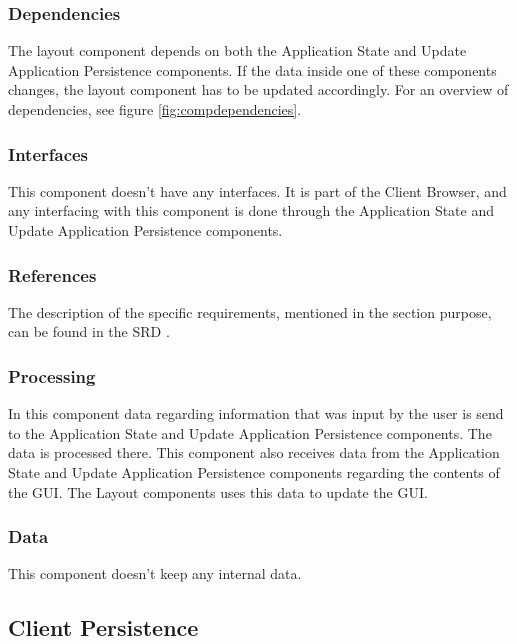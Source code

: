\subsubsection*{Dependencies}
The layout component depends on both the Application State and Update Application Persistence components. If the data inside one of these components changes, the layout component has to be updated accordingly. For an overview of dependencies, see figure \ref{fig:compdependencies}.

\subsubsection*{Interfaces}
This component doesn't have any interfaces. It is part of the Client Browser, and any interfacing with this component is done through the Application State and Update Application Persistence components.

\subsubsection*{References}
The description of the specific requirements, mentioned in the section purpose, can be found in the SRD \cite{srd}.

\subsubsection*{Processing}
In this component data regarding information that was input by the user is send to the Application State and Update Application Persistence components. The data is processed there. This component also receives data from the Application State and Update Application Persistence components regarding the contents of the GUI. The Layout components uses this data to update the GUI.

\subsubsection*{Data}
This component doesn't keep any internal data.

\subsection{Client Persistence}

